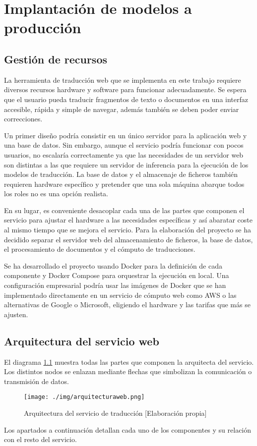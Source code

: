 \chapter{Implantación de modelos a producción}\label{deployprod}
\section{Gestión de recursos}\label{gestionrecursosimplant}
La herramienta de traducción web que se implementa en este trabajo requiere diversos recursos hardware y software para funcionar adecuadamente. Se espera que el usuario pueda traducir fragmentos de texto o documentos en una interfaz accesible, rápida y simple de navegar, además también se deben poder enviar correcciones.

Un primer diseño podría consistir en un único servidor para la aplicación web y una base de datos. Sin embargo, aunque el servicio podría funcionar con pocos usuarios, no escalaría correctamente ya que las necesidades de un servidor web son distintas a las que requiere un servidor de inferencia para la ejecución de los modelos de traducción. La base de datos y el almacenaje de ficheros también requieren hardware específico y pretender que una sola máquina abarque todos los roles no es una opción realista.

En su lugar, es conveniente desacoplar cada una de las partes que componen el servicio para ajustar el hardware a las necesidades específicas y así abaratar coste al mismo tiempo que se mejora el servicio. Para la elaboración del proyecto se ha decidido separar el servidor web del almacenamiento de ficheros, la base de datos, el procesamiento de documentos y el cómputo de traducciones.

Se ha desarrollado el proyecto usando Docker para la definición de cada componente y Docker Compose para orquestrar la ejecución en local. Una configuración empresarial podría usar las imágenes de Docker que se han implementado directamente en un servicio de cómputo web como AWS o las alternativas de Google o Microsoft, eligiendo el hardware y las tarifas que más se ajusten.

\section{Arquitectura del servicio web}
El diagrama \ref{webdiagram} muestra todas las partes que componen la arquitecta del servicio. Los distintos nodos se enlazan mediante flechas que simbolizan la comunicación o transmisión de datos.
\begin{figure}[H]
    \centering
    \texttt{[image: ./img/arquitecturaweb.png]}
    \caption{Arquitectura del servicio de traducción [Elaboración propia]}\label{webdiagram}
\end{figure}
Los apartados a continuación detallan cada uno de los componentes y su relación con el resto del servicio.

